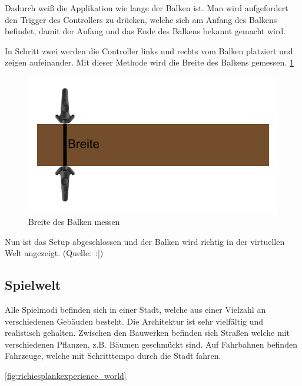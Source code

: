 Dadurch weiß die Applikation wie lange der Balken ist.
Man wird aufgefordert den Trigger des Controllers zu drücken, welche sich am Anfang des Balkens befindet, damit der Anfang und das Ende des Balkens bekannt gemacht wird.



In Schritt zwei werden die Controller links und rechts vom Balken platziert und zeigen aufeinander.
Mit dieser Methode wird die Breite des Balkens gemessen.
\ref{fig:beam_width_measurement} %

\begin {figure}
    \includegraphics[scale=0.18]{pics/beam_width_measurement}
    \caption{Breite des Balken messen}
    \label{fig:beam_width_measurement}
\end {figure}


Nun ist das Setup abgeschlossen und der Balken wird richtig in der virtuellen Welt angezeigt.
(Quelle:~\cite{ToastGames_2021_Setup}:])

\subsection{Spielwelt}
\label{sec:richiesplankexperience_world}
Alle Spielmodi befinden sich in einer Stadt, welche aus einer Vielzahl an verschiedenen Gebäuden besteht.
Die Architektur ist sehr vielfältig und realistisch gehalten.
Zwischen den Bauwerken befinden sich Straßen welche mit verschiedenen Pflanzen, z.B. Bäumen geschmückt sind.
Auf Fahrbahnen befinden Fahrzeuge, welche mit Schritttempo durch die Stadt fahren.

\ref{fig:richiesplankexperience_world} %

